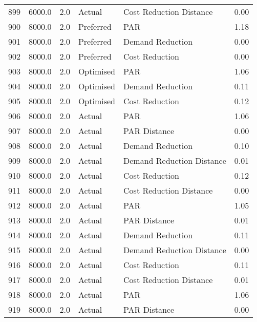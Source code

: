 \begin{longtable}{lrrllr}
899  &       6000.0 &     2.0 &         Actual &    Cost Reduction Distance &   0.00 \\
900  &       8000.0 &     2.0 &      Preferred &                        PAR &   1.18 \\
901  &       8000.0 &     2.0 &      Preferred &           Demand Reduction &   0.00 \\
902  &       8000.0 &     2.0 &      Preferred &             Cost Reduction &   0.00 \\
903  &       8000.0 &     2.0 &      Optimised &                        PAR &   1.06 \\
904  &       8000.0 &     2.0 &      Optimised &           Demand Reduction &   0.11 \\
905  &       8000.0 &     2.0 &      Optimised &             Cost Reduction &   0.12 \\
906  &       8000.0 &     2.0 &         Actual &                        PAR &   1.06 \\
907  &       8000.0 &     2.0 &         Actual &               PAR Distance &   0.00 \\
908  &       8000.0 &     2.0 &         Actual &           Demand Reduction &   0.10 \\
909  &       8000.0 &     2.0 &         Actual &  Demand Reduction Distance &   0.01 \\
910  &       8000.0 &     2.0 &         Actual &             Cost Reduction &   0.12 \\
911  &       8000.0 &     2.0 &         Actual &    Cost Reduction Distance &   0.00 \\
912  &       8000.0 &     2.0 &         Actual &                        PAR &   1.05 \\
913  &       8000.0 &     2.0 &         Actual &               PAR Distance &   0.01 \\
914  &       8000.0 &     2.0 &         Actual &           Demand Reduction &   0.11 \\
915  &       8000.0 &     2.0 &         Actual &  Demand Reduction Distance &   0.00 \\
916  &       8000.0 &     2.0 &         Actual &             Cost Reduction &   0.11 \\
917  &       8000.0 &     2.0 &         Actual &    Cost Reduction Distance &   0.01 \\
918  &       8000.0 &     2.0 &         Actual &                        PAR &   1.06 \\
919  &       8000.0 &     2.0 &         Actual &               PAR Distance &   0.00 \\

\end{longtable}
